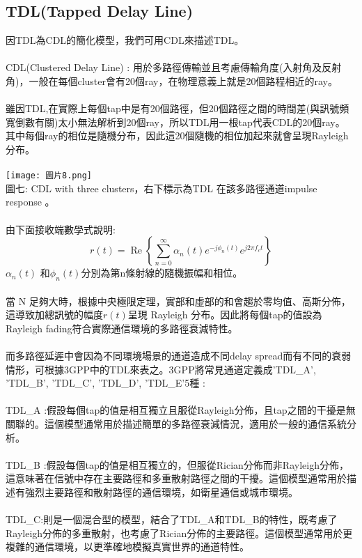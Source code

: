 \documentclass[12pt,a4paper]{article} %
\begin{document}
\subsection{TDL(Tapped Delay Line)}
因TDL為CDL的簡化模型，我們可用CDL來描述TDL。\\
\\
CDL(Clustered Delay Line)\cite{jana2023sensing} : 用於多路徑傳輸並且考慮傳輸角度(入射角及反射角)，一般在每個cluster會有20個ray，在物理意義上就是20個路程相近的ray。\\
\\
雖因TDL\cite{jana2023sensing},\cite{rappaport2024wireless}在實際上每個tap中是有20個路徑，但20個路徑之間的時間差(與訊號頻寬倒數有關)太小無法解析到20個ray，所以TDL用一根tap代表CDL的20個ray。 其中每個ray的相位是隨機分布，因此這20個隨機的相位加起來就會呈現Rayleigh分布。\\
\\
\texttt{[image: 圖片8.png]}\\
圖七: CDL with three clusters，右下標示為TDL 在該多路徑通道impulse response \cite{jana2023sensing}。\\
\\
由下面接收端數學式說明: 
\[r(t) = \operatorname{Re}\left\{ \sum_{n=0}^{\infty} \alpha_n(t) e^{-j\phi_n(t)} e^{j2\pi f_c t} \right\}\]
$\alpha_n(t)$ 和$\phi_n(t)$分別為第n條射線的隨機振幅和相位。\\
\\
當 N 足夠大時，根據中央極限定理，實部和虛部的和會趨於零均值、高斯分佈，這導致加總訊號的幅度$r(t)$呈現 Rayleigh 分布。因此將每個tap的值設為Rayleigh fading符合實際通信環境的多路徑衰減特性。\\
\\
而多路徑延遲中會因為不同環境場景的通道造成不同delay spread而有不同的衰弱情形，可根據3GPP中的TDL來表之。3GPP\cite{zhu20213gpp}將常見通道定義成'TDL\_A', 'TDL\_B', 'TDL\_C', 'TDL\_D', 'TDL\_E'5種 :\\
\\
TDL\_A :假設每個tap的值是相互獨立且服從Rayleigh分佈，且tap之間的干擾是無關聯的。這個模型通常用於描述簡單的多路徑衰減情況，適用於一般的通信系統分析。\\
\\
TDL\_B :假設每個tap的值是相互獨立的，但服從Rician分佈而非Rayleigh分佈，這意味著在信號中存在主要路徑和多重散射路徑之間的干擾。這個模型通常用於描述有強烈主要路徑和散射路徑的通信環境，如衛星通信或城市環境。\\
\\
TDL\_C:則是一個混合型的模型，結合了TDL\_A和TDL\_B的特性，既考慮了Rayleigh分佈的多重散射，也考慮了Rician分佈的主要路徑。這個模型通常用於更複雜的通信環境，以更準確地模擬真實世界的通道特性。\\
\end{document}
